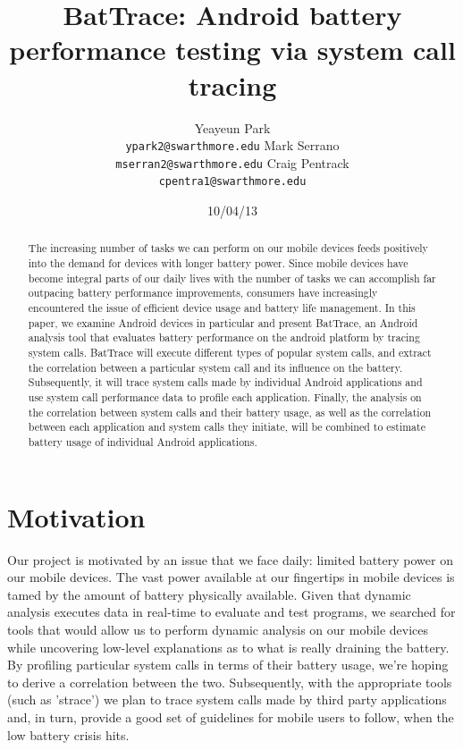 \documentclass[11pt]{article}
\title{BatTrace: Android battery performance testing via system call tracing}
\author{Yeayeun Park\\
{\tt ypark2@swarthmore.edu}
\And 
Mark Serrano\\
{\tt mserran2@swarthmore.edu}
\AND
Craig Pentrack\\                 
{\tt cpentra1@swarthmore.edu}}
\date{10/04/13}
\begin{document}
\maketitle
\begin{abstract}
  The increasing number of tasks we can perform on our mobile devices 
  feeds positively into the demand for devices with longer battery power. 
  Since mobile devices have become integral parts of our daily lives with
  the number of tasks we can accomplish far outpacing battery performance 
  improvements, consumers have increasingly encountered the issue of 
  efficient device usage and battery life management. In this paper, we 
  examine Android devices in particular and present BatTrace, an Android 
  analysis tool that evaluates battery performance on the android platform
  by tracing system calls. BatTrace will execute different types of popular system
  calls, and extract the correlation between a particular system call and its 
  influence on the battery. Subsequently, it will trace system calls made by 
  individual Android applications and use system call performance data to profile
  each application. Finally, the analysis on the correlation between system calls and their 
  battery usage, as well as the correlation between each application and system 
  calls they initiate, will be combined to estimate battery usage 
  of individual Android applications.
\end{abstract}

\section{Motivation}

Our project is motivated by an issue that we face daily: limited battery power 
on our mobile devices. The vast power available at our fingertips in mobile
devices is tamed by the amount of battery physically available. Given 
that dynamic analysis executes data in real-time to evaluate and test programs, 
we searched for tools that would allow us to perform dynamic analysis on our 
mobile devices while uncovering low-level explanations as to what is really 
draining the battery. By profiling particular system calls in terms of their battery
usage, we're hoping to derive a correlation between the two. Subsequently, with the
appropriate tools (such as 'strace') we plan to trace system calls made by third 
party applications and, in turn, provide a good set of guidelines for mobile users 
to follow, when the low battery crisis hits.
\end{document}
